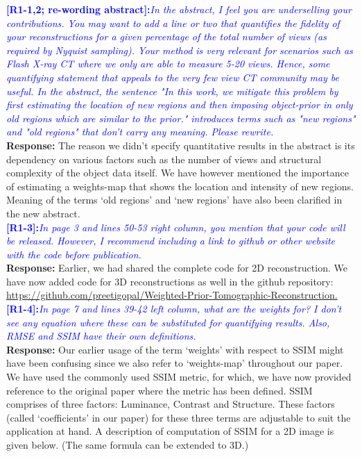 \documentclass{article}
\begin{document}
  \textcolor{blue}{\textbf{[R1-1,2; re-wording abstract]:}\textit{In the abstract, I feel you are underselling your contributions. You may want to add a line or two that quantifies the fidelity of your reconstructions for a given percentage of the total number of views (as required by Nyquist sampling). Your method is very relevant for scenarios such as Flash X-ray CT where we only are able to measure 5-20 views. Hence, some quantifying statement that appeals to the very few view CT community may be useful. In the abstract, the sentence "In this work, we mitigate this problem by first estimating the location of new regions and then imposing object-prior in only old regions which are similar to the prior." introduces terms such as "new regions" and "old regions" that don't carry any meaning. Please rewrite.}}\\

  \textbf{Response:} The reason we didn't specify quantitative results in the abstract is its dependency on various factors such as the number of views and structural complexity of the object data itself. We have however mentioned the importance of estimating a weights-map that shows the location and intensity of new regions. Meaning of the terms `old regions' and `new regions' have also been clarified in the new abstract.\\


  \textcolor{blue}{\textbf{[R1-3]:}\textit{In page 3 and lines 50-53 right column, you mention that your code will be released. However, I recommend including a link to github or other website with the code before publication.}}\\

  \textbf{Response:} Earlier, we had shared the complete code for 2D reconstruction. We have now added code for 3D reconstructions as well in the github repository: \url{https://github.com/preetigopal/Weighted-Prior-Tomographic-Reconstruction.}\\

  \textcolor{blue}{\textbf{[R1-4]:}\textit{In page 7 and lines 39-42 left column, what are the weights for? I don't see any equation where these can be substituted for quantifying results. Also, RMSE and SSIM have their own definitions.}}\\

  \textbf{Response:} Our earlier usage of the term `weights' with respect to SSIM might have been confusing since we also refer to `weights-map' throughout our paper. We have used the commonly used SSIM metric, for which, we have now provided reference to the original paper where the metric has been defined. SSIM comprises of three factors: Luminance, Contrast and Structure. These factors (called `coefficients' in our paper) for these three terms are adjustable to suit the application at hand. A description of computation of SSIM for a 2D image is given below. (The same formula can be extended to 3D.)
\end{document}
